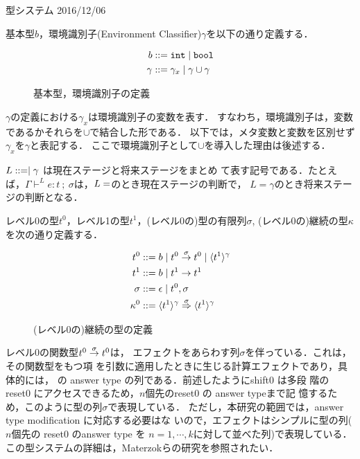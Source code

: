 \documentclass[dvipdfmx]{jsarticle}
\begin{document}
\begin{center}
  型システム
  2016/12/06
\end{center}

基本型$b$，環境識別子(Environment Classifier)$\gamma$を以下の通り定義する．

\begin{figure}[H]
  \centering
  \begin{align*}
    b & ::= \mbox{\texttt{int}} \mid \mbox{\texttt{bool}} \\
    \gamma & ::= \gamma_x \mid \gamma \cup \gamma
  \end{align*}
  \caption{基本型，環境識別子の定義}
  \label{fig:bec_def}
\end{figure}

$\gamma$の定義における$\gamma_x$は環境識別子の変数を表す．
すなわち，環境識別子は，変数であるかそれらを$\cup$で結合した形である．
以下では，メタ変数と変数を区別せず$\gamma_x$を$\gamma$と表記する．
ここで環境識別子として$\cup$を導入した理由は後述する．

$L ::= \empty \mid \gamma$ は現在ステージと将来ステージをまとめ
て表す記号である．たとえば，$\Gamma \vdash^L
e:t~;~\sigma$は，$L=\empty$のとき現在ステージの判断で，
$L=\gamma$のとき将来ステージの判断となる．

レベル0の型$t^0$，レベル1の型$t^1$，(レベル0の)型の有限列$\sigma$,
(レベル0の)継続の型$\kappa$を次の通り定義する．

\begin{figure}[H]
  \centering
  \begin{align*}
    t^0 & ::= b \mid {t^0} \stackrel{\sigma}{\rightarrow} {t^0} \mid \langle{t^1}\rangle^{\gamma} \\
    t^1 & ::= b \mid t^1 \to t^1 \\
    \sigma & ::= \epsilon \mid t^0, \sigma \\
    \kappa^0 & ::= {\langle{t^1}\rangle^{\gamma}} \stackrel{\sigma}{\Rightarrow} {\langle{t^1}\rangle^{\gamma}}
  \end{align*}
  \caption{(レベル0の)継続の型の定義}
  \label{fig:k_def}
\end{figure}

レベル0の関数型${t^0} \stackrel{\sigma}{\rightarrow} {t^0}$は，
エフェクトをあらわす列$\sigma$を伴っている．これは，その関数型をもつ項
を引数に適用したときに生じる計算エフェクトであり，具体的には，
\Shiftz の answer type の列である．前述したようにshift0 は多段
階の reset0 にアクセスできるため，$n$個先のreset0 の answer typeまで記
憶するため，このように型の列$\sigma$で表現している．
ただし，本研究の範囲では，answer type modification に対応する必要はな
いので，エフェクトはシンプルに型の列($n$個先の reset0 のanswer type を
$n=1,\cdots,k$に対して並べた列)で表現している．
この型システムの詳細は，Materzokら\cite{Materzok2011}の研究を参照されたい．
\end{document}
